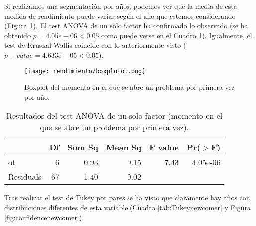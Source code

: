 Si realizamos una segmentación por años, podemos ver que la media de esta medida de rendimiento puede variar según el año que estemos considerando (Figura \ref{fig:boxplotnewcomer}). El test ANOVA de un sólo factor ha confirmado lo observado (se ha obtenido $p = 4.05e-06 < 0.05$ como puede verse en el Cuadro \ref{tab:ANOVAnewcomer}). Igualmente, el test de Kruskal-Wallis coincide con lo anteriormente visto ($p-value = 4.633e-05 < 0.05$).

\begin{figure}[H]
    \centering
    \texttt{[image: rendimiento/boxplotot.png]}
    \caption{Boxplot del momento en el que se abre un problema por primera vez por año.}
    \label{fig:boxplotnewcomer}
\end{figure}

\begin{table}[H]
\centering
\caption{Resultados del test ANOVA de un solo factor (momento en el que se abre un problema por primera vez).}
\label{tab:ANOVAnewcomer}
\begin{tabular}{lrrrrr}
  \hline
 & Df & Sum Sq & Mean Sq & F value & Pr($>$F) \\ 
  \hline
ot & 6 & 0.93 & 0.15 & 7.43 & 4.05e-06 \\ 
  Residuals            & 67 & 1.40 & 0.02 &  &  \\ 
   \hline
\end{tabular}
\end{table}

Tras realizar el test de Tukey por pares se ha visto que claramente hay años con distribuciones diferentes de esta variable (Cuadro \ref{tab:Tukeynewcomer} y Figura \ref{fig:confidencenewcomer}).

